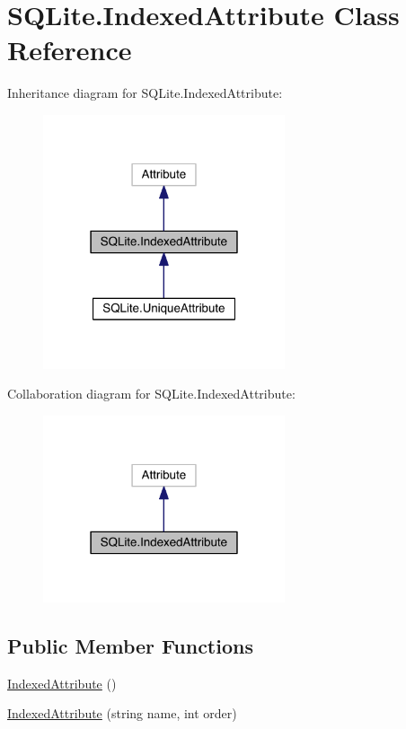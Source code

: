 \hypertarget{class_s_q_lite_1_1_indexed_attribute}{\section{S\+Q\+Lite.\+Indexed\+Attribute Class Reference}
\label{class_s_q_lite_1_1_indexed_attribute}
}


Inheritance diagram for S\+Q\+Lite.\+Indexed\+Attribute\+:
\nopagebreak
\begin{figure}[H]
\begin{center}
\leavevmode
\includegraphics[width=202pt]{class_s_q_lite_1_1_indexed_attribute__inherit__graph}
\end{center}
\end{figure}


Collaboration diagram for S\+Q\+Lite.\+Indexed\+Attribute\+:
\nopagebreak
\begin{figure}[H]
\begin{center}
\leavevmode
\includegraphics[width=202pt]{class_s_q_lite_1_1_indexed_attribute__coll__graph}
\end{center}
\end{figure}
\subsection*{Public Member Functions}
\begin{DoxyCompactItemize}
\item 
\hyperlink{class_s_q_lite_1_1_indexed_attribute_a4c01c07e1c18a6d4743316c5f0760a34}{Indexed\+Attribute} ()
\item 
\hyperlink{class_s_q_lite_1_1_indexed_attribute_a6d43155fc211d6c76d27326c66c39752}{Indexed\+Attribute} (string name, int order)
\end{DoxyCompactItemize}
